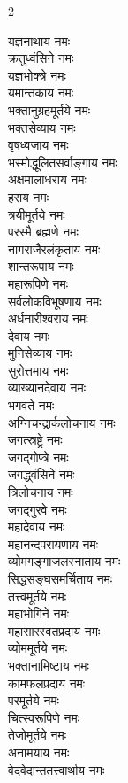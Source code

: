\begin{multicols}{2}
\begin{flushleft}
यज्ञनाथाय नमः\\
क्रतुध्वंसिने नमः\\
यज्ञभोक्त्रे नमः\\
यमान्तकाय नमः\\
भक्तानुग्रहमूर्तये नमः\\
भक्तसेव्याय नमः\\
वृषध्वजाय नमः\\
भस्मोद्धूलितसर्वाङ्गाय नमः\\
अक्षमालाधराय नमः\\
हराय नमः \hfill {}\\
त्रयीमूर्तये नमः\\
परस्मै ब्रह्मणे नमः\\
नागराजैरलंकृताय नमः\\
शान्तरूपाय नमः\\
महारूपिणे नमः\\
सर्वलोकविभूषणाय नमः\\
अर्धनारीश्वराय नमः\\
देवाय नमः\\
मुनिसेव्याय नमः\\
सुरोत्तमाय नमः \hfill {}\\
व्याख्यानदेवाय नमः\\
भगवते नमः\\
अग्निचन्द्रार्कलोचनाय नमः\\
जगत्स्रष्ट्रे नमः\\
जगद्गोप्त्रे नमः\\
जगद्ध्वंसिने नमः\\
त्रिलोचनाय नमः\\
जगद्गुरवे नमः\\
महादेवाय नमः\\
महानन्दपरायणाय नमः \hfill {}\\
व्योमगङ्गाजलस्नाताय नमः\\
सिद्धसङ्घसमर्चिताय नमः\\
तत्त्वमूर्तये नमः\\
महाभोगिने नमः\\
महासारस्वतप्रदाय नमः\\
व्योममूर्तये नमः\\
भक्तानामिष्टाय नमः\\
कामफलप्रदाय नमः\\
परमूर्तये नमः\\
चित्स्वरूपिणे नमः \hfill {}\\
तेजोमूर्तये नमः\\
अनामयाय नमः\\
वेदवेदान्ततत्त्वार्थाय नमः\\

\end{flushleft}
\end{multicols}
